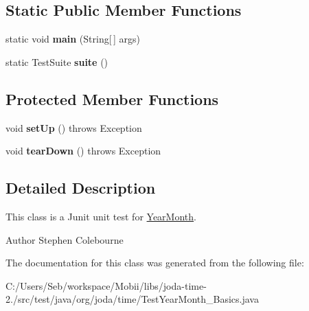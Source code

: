 \subsection*{Static Public Member Functions}
\begin{DoxyCompactItemize}
\item 
\hypertarget{classorg_1_1joda_1_1time_1_1_test_year_month___basics_a04dfac4ca1e26adc404d27c86790a36e}{static void {\bfseries main} (String\mbox{[}$\,$\mbox{]} args)}\label{classorg_1_1joda_1_1time_1_1_test_year_month___basics_a04dfac4ca1e26adc404d27c86790a36e}

\item 
\hypertarget{classorg_1_1joda_1_1time_1_1_test_year_month___basics_a5134230cecb70c086ed1f3c82e3d8b6a}{static Test\-Suite {\bfseries suite} ()}\label{classorg_1_1joda_1_1time_1_1_test_year_month___basics_a5134230cecb70c086ed1f3c82e3d8b6a}

\end{DoxyCompactItemize}
\subsection*{Protected Member Functions}
\begin{DoxyCompactItemize}
\item 
\hypertarget{classorg_1_1joda_1_1time_1_1_test_year_month___basics_a0237ba51fb98489924e29517c28e9c35}{void {\bfseries set\-Up} ()  throws Exception }\label{classorg_1_1joda_1_1time_1_1_test_year_month___basics_a0237ba51fb98489924e29517c28e9c35}

\item 
\hypertarget{classorg_1_1joda_1_1time_1_1_test_year_month___basics_a0fa18f2bb40cbea366f2ff83d9f9e692}{void {\bfseries tear\-Down} ()  throws Exception }\label{classorg_1_1joda_1_1time_1_1_test_year_month___basics_a0fa18f2bb40cbea366f2ff83d9f9e692}

\end{DoxyCompactItemize}


\subsection{Detailed Description}
This class is a Junit unit test for \hyperlink{classorg_1_1joda_1_1time_1_1_year_month}{Year\-Month}.

\begin{DoxyAuthor}{Author}
Stephen Colebourne 
\end{DoxyAuthor}


The documentation for this class was generated from the following file\-:\begin{DoxyCompactItemize}
\item 
C\-:/\-Users/\-Seb/workspace/\-Mobii/libs/joda-\/time-\/2./src/test/java/org/joda/time/Test\-Year\-Month\-\_\-\-Basics.\-java\end{DoxyCompactItemize}
